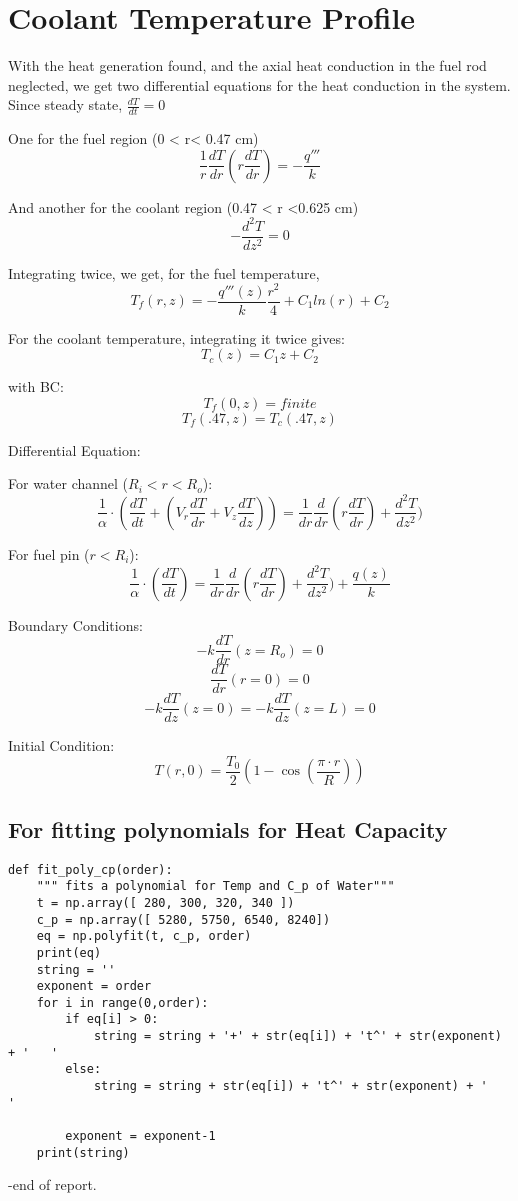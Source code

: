 \documentclass[12pt,letterpaper]{article}
\begin{document}
\section*{Coolant Temperature Profile}
With the heat generation found, and the axial heat
conduction in the fuel rod neglected, we get two differential
equations for the heat conduction in the system.
Since steady state, $\frac{dT}{dt} = 0 $

One for the fuel region (0 < r< 0.47 cm)
\[\frac{1}{r} \frac{dT}{dr} (r \frac{dT}{dr}) = -\frac{q'''}{k}\]

And another for the coolant region (0.47 < r <0.625 cm)
\[-\frac{d^2T}{dz^2} = 0\]


Integrating twice, we get, for the fuel temperature,
\[T_f(r,z) = -\frac{q'''(z)}{k} \frac{r^2}{4} + C_1 ln(r) +C_2\]

For the coolant temperature, integrating it twice gives:
\[T_c(z) = C_1z + C_2 \]

with BC:
\[T_f(0,z) = finite\]
\[T_f(.47,z) = T_c(.47,z)\]


\pagebreak
Differential Equation:

For water channel ($R_i < r < R_o$):
\[\frac{1}{\alpha} \cdot (\frac{dT}{dt} + (V_r \frac{dT}{dr} + V_z \frac{dT}{dz})) =
  \frac{1}{dr} \frac{d}{dr} (r \frac{dT}{dr}) + \frac{d^2T}{dz^2})\]

For fuel pin ($r < R_i$):
\[\frac{1}{\alpha} \cdot (\frac{dT}{dt}) =
  \frac{1}{dr} \frac{d}{dr} (r \frac{dT}{dr}) + \frac{d^2T}{dz^2}) + \frac{q(z)}{k}\]

Boundary Conditions:
\[-k \frac{dT}{dr}(z=R_o) = 0 \]
\[\frac{dT}{dr}(r=0) = 0\]
\[-k \frac{dT}{dz}(z=0) = -k \frac{dT}{dz}(z=L) = 0 \]
 

Initial Condition:
\[T(r,0) = \frac{T_0}{2} (1-\cos{(\frac{\pi \cdot r}{R})}) \]




\begin{appendices}

\section{For fitting polynomials for Heat Capacity}

\begin{verbatim}
def fit_poly_cp(order):
    """ fits a polynomial for Temp and C_p of Water"""
    t = np.array([ 280, 300, 320, 340 ])
    c_p = np.array([ 5280, 5750, 6540, 8240])
    eq = np.polyfit(t, c_p, order)
    print(eq)
    string = ''
    exponent = order
    for i in range(0,order):
        if eq[i] > 0:
            string = string + '+' + str(eq[i]) + 't^' + str(exponent) + '   '
        else:
            string = string + str(eq[i]) + 't^' + str(exponent) + '   '
            
        exponent = exponent-1
    print(string)

\end{verbatim}


\end{appendices}
\pagebreak

-end of report.
\end{document}
